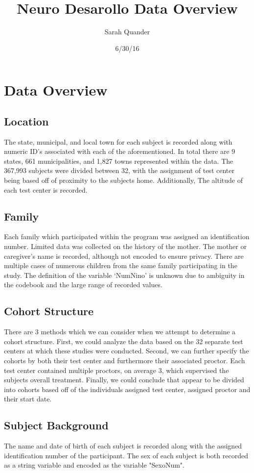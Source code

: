 \documentclass[12pt]{article}
\begin{document}
\title{Neuro Desarollo Data Overview}
\author{ Sarah Quander}
\date {6/30/16}
\section{Data Overview}

\subsection{Location}
The state, municipal, and local town for each subject is recorded along with numeric ID's associated with each of the aforementioned. In total there are 9 states, 661 municipalities, and 1,827 towns represented within the data. The 367,993 subjects were divided between 32, with the assignment of test center being based off of proximity to the subjects home. Additionally, The altitude of each test center is recorded.

\subsection{Family}
Each family which participated within the program was assigned an identification number. Limited data was collected on the history of the mother. The mother or caregiver's name is recorded, although not encoded to ensure privacy. There are multiple cases of numerous children from the same family participating in the study. The definition of the variable `NumNino' is unknown due to ambiguity in the codebook and the large range of recorded values.

\subsection{Cohort Structure}
There are 3 methods which we can consider when we attempt to determine a cohort structure. First, we could analyze the data based on the 32 separate test centers at which these studies were conducted. Second, we can further specify the cohorts by both their test center and furthermore their associated proctor. Each test center contained multiple proctors, on average 3, which supervised the subjects overall treatment. Finally, we could conclude that appear to be divided into cohorts based off of the individuals assigned test center, assigned proctor and their start date.

\subsection{Subject Background}
The name and date of birth of each subject is recorded along with the assigned identification number of the participant. The sex of each subject is both recorded as a string variable and encoded as the variable "SexoNum".  
\end{document}
